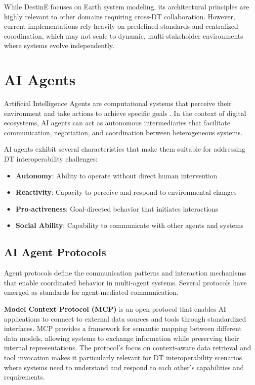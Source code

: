 While DestinE focuses on Earth system modeling, its architectural principles are highly relevant to other domains requiring cross-DT collaboration. However, current implementations rely heavily on predefined standards and centralized coordination, which may not scale to dynamic, multi-stakeholder environments where systems evolve independently.

\section{AI Agents}

Artificial Intelligence Agents are computational systems that perceive their environment and take actions to achieve specific goals \cite{Russell2020}. In the context of digital ecosystems, AI agents can act as autonomous intermediaries that facilitate communication, negotiation, and coordination between heterogeneous systems.

AI agents exhibit several characteristics that make them suitable for addressing DT interoperability challenges:
\begin{itemize}
    \item \textbf{Autonomy}: Ability to operate without direct human intervention
    \item \textbf{Reactivity}: Capacity to perceive and respond to environmental changes
    \item \textbf{Pro-activeness}: Goal-directed behavior that initiates interactions
    \item \textbf{Social Ability}: Capability to communicate with other agents and systems
\end{itemize}

\subsection{AI Agent Protocols}

Agent protocols define the communication patterns and interaction mechanisms that enable coordinated behavior in multi-agent systems. Several protocols have emerged as standards for agent-mediated communication.

\textbf{Model Context Protocol (MCP)} is an open protocol that enables AI applications to connect to external data sources and tools through standardized interfaces. MCP provides a framework for semantic mapping between different data models, allowing systems to exchange information while preserving their internal representations. The protocol's focus on context-aware data retrieval and tool invocation makes it particularly relevant for DT interoperability scenarios where systems need to understand and respond to each other's capabilities and requirements.

